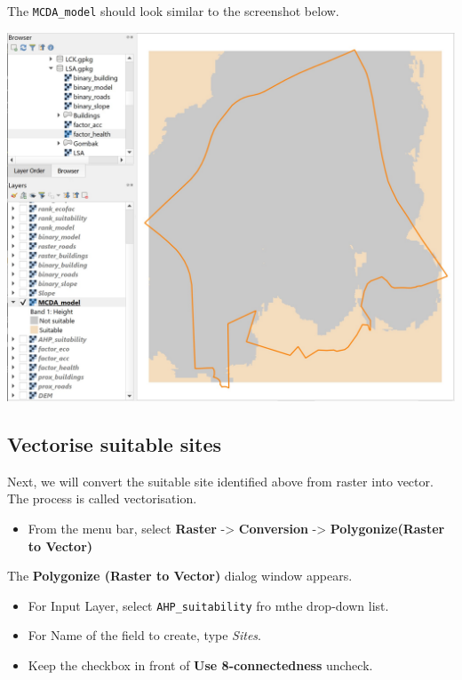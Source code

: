 \documentclass[
  letterpaper,
  DIV=11,
  numbers=noendperiod]{scrreprt}
\providecommand{\tightlist}{%
  \setlength{\itemsep}{0pt}\setlength{\parskip}{0pt}}\usepackage{longtable,booktabs,array}
\begin{document}
The \texttt{MCDA\_model} should look similar to the screenshot below.

\includegraphics{./img08/image20.jpg}

\hypertarget{vectorise-suitable-sites}{%
\subsection{Vectorise suitable sites}\label{vectorise-suitable-sites}}

Next, we will convert the suitable site identified above from raster
into vector. The process is called vectorisation.

\begin{itemize}
\tightlist
\item
  From the menu bar, select \textbf{Raster} -\textgreater{}
  \textbf{Conversion} -\textgreater{} \textbf{Polygonize(Raster to
  Vector)}
\end{itemize}

The \textbf{Polygonize (Raster to Vector)} dialog window appears.

\begin{itemize}
\tightlist
\item
  For Input Layer, select \texttt{AHP\_suitability} fro mthe drop-down
  list.
\item
  For Name of the field to create, type \emph{Sites}.
\item
  Keep the checkbox in front of \textbf{Use 8-connectedness} uncheck.
\end{itemize}
\end{document}

